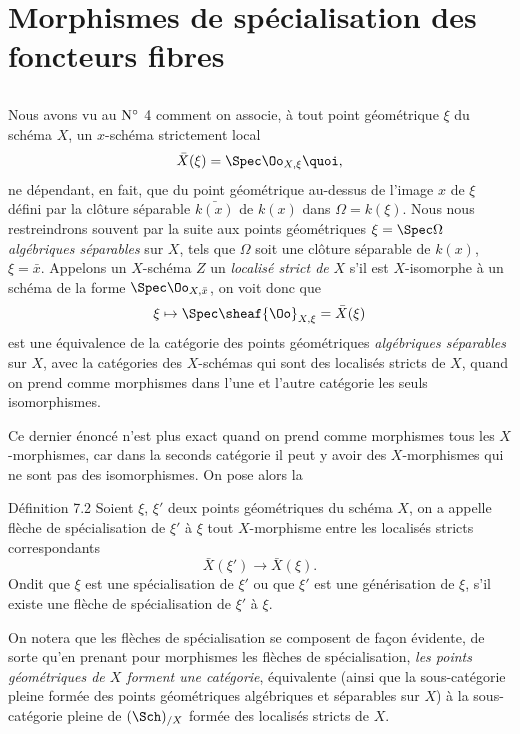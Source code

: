 \documentclass[10pt]{../fichiers-configuration-latex/smfart}
\begin{document}
\section{Morphismes de spécialisation des foncteurs
  fibres}\pageoriginale
{}

\subsection{}

Nous avons vu au ${\rm N^{\circ}}$ 4 comment on associe,
à tout point
géométrique $\xi$ du schéma $X$, un $x$-schéma strictement local
$$
\bar{X}(\xi) = \Spec \Oo_{X, \xi}{\quoi},
$$
ne dépendant, en fait, que du point géométrique au-dessus de l'image
$x$ de $\xi$ défini par la clôture séparable $\bar{k(x)}$ de $k(x)$
dans $\Omega = k(\xi)$. Nous nous restreindrons souvent par la suite
aux points géométriques $\xi = \Spec \Omega$ \emph{algébriques
  séparables} sur $X$, \ie tels que $\Omega$ soit une clôture
séparable de $k(x)$, \ie $\xi = \bar{x}$. Appelons un
$X$-schéma $Z$ un \emph{localisé strict de} $X$ s'il est $X$-isomorphe
à un schéma de la forme $\Spec \Oo_{X, \bar{x}}$, on voit donc
que
$$
\xi \mapsto \Spec \sheaf{\Oo}_{X, \xi} = \bar{X}(\xi)
$$
est une équivalence de la catégorie des points géométriques
\emph{algébriques séparables} sur $X$, avec la catégories des
$X$-schémas qui sont des localisés stricts de $X$, quand on prend
comme morphismes dans l'une et l'autre catégorie les seuls
isomorphismes.

Ce dernier énoncé n'est plus exact quand on prend comme morphismes
tous les $X$-morphismes, car dans la seconds catégorie il peut y avoir
des $X$-morphismes qui ne sont pas des isomorphismes. On pose alors la

\begin{enonce*}{Définition 7.2}
Soient $\xi$, $\xi'$ deux points géométriques du schéma $X$, on a
appelle flèche de spécialisation de $\xi'$ à $\xi$ tout $X$-morphisme
entre les localisés stricts correspondants
$$
\bar{X} (\xi') \to \bar{X} (\xi).
$$
On\pageoriginale dit que $\xi$ est une spécialisation de $\xi'$ ou
que $\xi'$ est une générisation de $\xi$, s'il existe une flèche de
spécialisation de $\xi'$ à $\xi$.
\end{enonce*}

On notera que les flèches de spécialisation se composent de façon
évidente, de sorte qu'en prenant pour morphismes les flèches de
spécialisation, \emph{les points géométriques de $X$ forment une
  catégorie}, équivalente (ainsi que la sous-catégorie pleine formée
des points géométriques algébriques et séparables sur $X$) à la
sous-catégorie pleine de $(\Sch)_{/X}$ formée des localisés stricts de
$X$.
\end{document}

